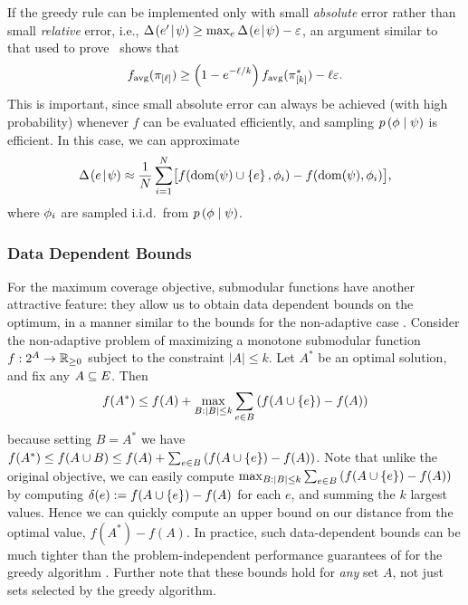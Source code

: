 If the greedy rule can be implemented only with small \emph{absolute} error rather than small \emph{relative} error, i.e., $\Delta \hspace{-0.3mm} \left( { {e'}\! \mid \! {{\color{black}{\ensuremath{\psi}}}} } \right)   \ge  \max_{e}
\Delta \hspace{-0.3mm} \left( { {e}\! \mid \! {{\color{black}{\ensuremath{\psi}}}} } \right)  -\varepsilon$, an argument similar to that used to
prove~
shows that 
\[
f_{\text{avg}}( \pi_{[{\ell}]} ) \ge  \left( {1 - e^{-\ell/k}} \right) 
f_{\text{avg}}( \pi^*_{[{k}]} ) - \ell\varepsilon
\mbox{.}
\]
This is important, since small absolute error can always be achieved
(with high probability) whenever $f$ can be evaluated efficiently, and
sampling ${\color{black}{\ensuremath{p \left( {{\color{black}{\ensuremath{\phi}}}\mid{\color{black}{\ensuremath{\psi}}}} \right) }}}$ is efficient. In this case, we can approximate
\[
\Delta \hspace{-0.3mm} \left( { {e}\! \mid \! {{\color{black}{\ensuremath{\psi}}}} } \right)   
\approx \frac{1}{N}\sum_{i=1}^{N}\bigl[f(\operatorname{dom}({\color{black}{\ensuremath{\psi}}}) \cup \left\{e\right\}, {\color{black}{\ensuremath{\phi}}}_{i}) - f(\operatorname{dom}({\color{black}{\ensuremath{\psi}}}), {\color{black}{\ensuremath{\phi}}}_{i})\bigr]\mbox{,}     
\]
where ${\color{black}{\ensuremath{\phi}}}_{i}$ are sampled i.i.d.~from ${\color{black}{\ensuremath{p \left( {{\color{black}{\ensuremath{\phi}}}\mid{\color{black}{\ensuremath{\psi}}}} \right) }}}$.



\subsubsection{Data Dependent Bounds} For the maximum coverage objective, \term submodular functions have
another attractive feature: they allow us to obtain data dependent
bounds on the optimum, in a manner similar to the bounds for the non-adaptive case \citep{minoux78}.
Consider the non-adaptive problem of maximizing a monotone submodular
function $f:2^{A} \to \mathbb{R}_{\ge 0}$ subject to the
constraint $|A| \le k$.  Let $A^*$ be an optimal solution, 
%
 and fix any $A \subseteq E$.  Then 
\begin{equation}
  \label{eq:data-dependent-bound}
   f(A^*) \le f(A) + \max_{B : |B| \le k} \sum_{e \in B}  \left( { f(A
     \cup \left\{e\right\}) - f(A)  } \right)  
\end{equation}
because setting $B = A^*$ we have 
$f(A^*) \le f(A \cup B) \le  f(A) + \sum_{e \in B}  \left( { f(A
     \cup \left\{e\right\}) - f(A)  } \right) $.
Note that unlike the original objective, we can easily compute 
$\max_{B : |B| \le k} \sum_{e \in B}  \left( { f(A \cup \left\{e\right\}) - f(A)
} \right)  $ by computing $\delta(e) := f(A \cup \left\{e\right\}) - f(A)$ for each
$e$, and summing the $k$ largest values.  Hence we can quickly compute
an upper bound on our distance from the optimal value, $f(A^*) - f(A)$. In practice, such data-dependent bounds can be much tighter than the problem-independent performance guarantees of \citet{nemhauser78} for the greedy algorithm \citep{leskovec07}. Further note that these bounds hold for \emph{any} set $A$, not just sets selected by the greedy algorithm.



